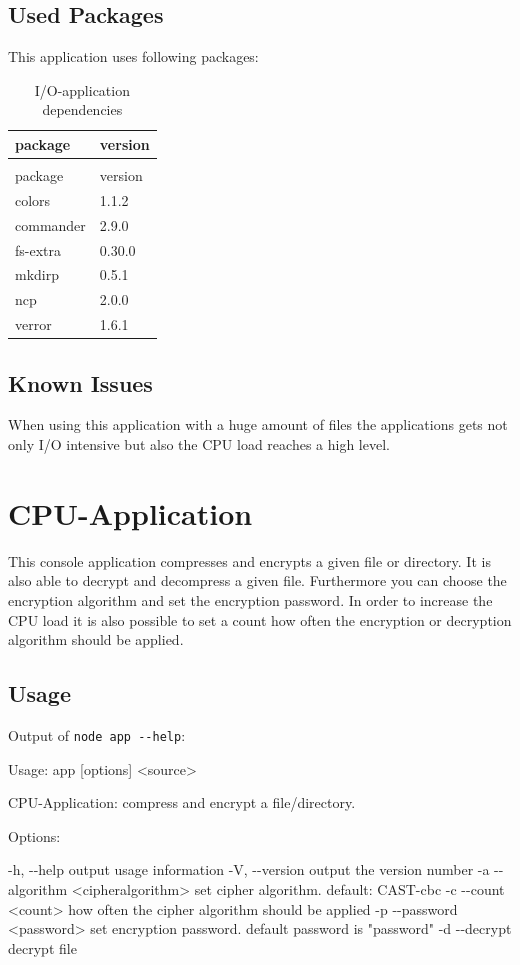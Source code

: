 	\subsection{Used Packages}
	This application uses following packages:
	\begin{longtable}{ll}
		\caption{I/O-application dependencies}\\
		package&version\\
		\hline
		\endfirsthead
		\caption[]{I/O-application dependencies}\\
		package&version\\
		\hline
		\endhead
		colors\cite{colors} & 1.1.2 \\
		commander\cite{commander} & 2.9.0 \\
		fs-extra\cite{fs-extra} & 0.30.0 \\
		mkdirp\cite{mkdirp} & 0.5.1 \\
		ncp\cite{ncp} & 2.0.0 \\
		verror\cite{verror} & 1.6.1 \\
	\end{longtable}
	\subsection{Known Issues}
	When using this application with a huge amount of files the applications gets not only I/O intensive but also the CPU load reaches a high level.
\section{CPU-Application}
	This console application compresses and encrypts a given file or directory. It is also able to decrypt and decompress a given file. Furthermore you can choose the encryption algorithm and set the encryption password. In order to increase the CPU load it is also possible to set a count how often the encryption or decryption algorithm should be applied.
	\subsection{Usage}
	\label{subsec:cpu-usage}
	Output of \texttt{node app -{}-help}:
	\par
	\begingroup
	\leftskip=1cm
	\noindent
	Usage: app [options] <source>
	
	  CPU-Application: compress and encrypt a file/directory.
	
	  Options:
	
	    -h, -{}-help                        output usage information\newline
	    -V, -{}-version                     output the version number\newline
	    -a -{}-algorithm <cipheralgorithm>  set cipher algorithm. default: CAST-cbc\newline
	    -c -{}-count <count>                how often the cipher algorithm should be applied\newline
	    -p -{}-password <password>          set encryption password. default password is "password"
	    -d -{}-decrypt                      decrypt file
	\par
	\endgroup
